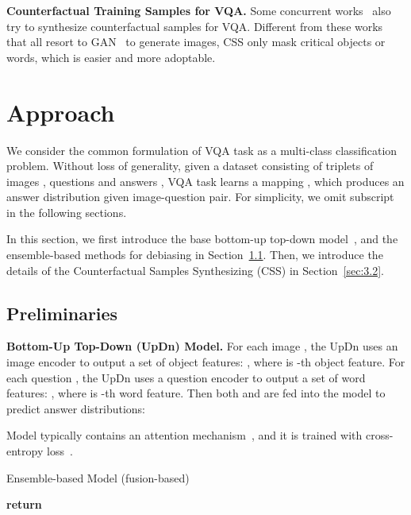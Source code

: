 \documentclass[10pt,twocolumn,letterpaper]{article}
\begin{document}
\textbf{Counterfactual Training Samples for VQA.}
Some concurrent works~\cite{agarwal2019towards,pan2019question} also try to synthesize counterfactual samples for VQA. Different from these works that all resort to GAN~\cite{goodfellow2014generative} to generate images, CSS only mask critical objects or words, which is easier and more adoptable.

\section{Approach}

We consider the common formulation of VQA task as a multi-class classification problem. Without loss of generality, given a dataset  consisting of triplets of images , questions  and answers , VQA task learns a mapping , which produces an answer distribution given image-question pair. For simplicity, we omit subscript  in the following sections.

In this section, we first introduce the base bottom-up top-down model~\cite{anderson2018bottom}, and the ensemble-based methods for debiasing in Section~\ref{sec:3.1}. Then, we introduce the details of the Counterfactual Samples Synthesizing (CSS) in Section~\ref{sec:3.2}.

\subsection{Preliminaries} \label{sec:3.1}

\noindent\textbf{Bottom-Up Top-Down (UpDn) Model.}
For each image , the UpDn uses an image encoder  to output a set of object features: , where  is -th object feature. For each question , the UpDn uses a question encoder  to output a set of word features: , where  is -th word feature. Then both  and  are fed into the model  to predict answer distributions:

Model  typically contains an attention mechanism~\cite{chen2017sca,niu2019recursive,ye2017video}, and it is trained with cross-entropy loss~\cite{tang2019learning,chen2019counterfactual}.

\begin{algorithm}[t]
	\caption{Ensemble-based Model (fusion-based)}\label{alg:VQA}
	\begin{algorithmic}[1]
		\Function {}{}
		\State 
		\State 
		\State 
		\State       {}
		\State 
		\State  {}
		\If{}
		\State \textbf{return} 
		\EndIf 
		\EndFunction
	\end{algorithmic}
\end{algorithm}
\end{document}
